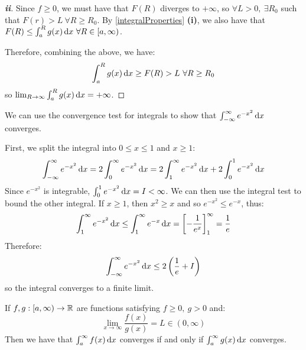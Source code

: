 \documentclass[../main.tex]{subfiles}
\begin{document}
\begin{proof}[\textbf{ii}]
  Since $f \geq 0$, we must have that $F(R)$ diverges to $+\infty$, so $\forall L > 0,\ \exists R_0$ such that $F(r) > L\ \forall R \geq R_0$.
  By \cref{integralProperties} \textbf{(i)}, we also have that $F(R) \leq \int_{a}^{R} g(x) \d{x}\ \forall R \in [a, \infty)$.

  Therefore, combining the above, we have:
  \[
    \int_{a}^{R} g(x) \d{x} \geq F(R) > L\ \forall R \geq R_0
  \]
  so $\lim_{R \to \infty} \int_{a}^{R} g(x) \d{x} = +\infty$.
\end{proof}
\begin{example}
  We can use the convergence test for integrals to show that $\int_{-\infty}^{\infty} e^{-x^2} \d{x}$ converges.

  First, we split the integral into $0 \leq x \leq 1$ and $x \geq 1$:
  \[
    \int_{-\infty}^{\infty} e^{-x^2} \d{x} = 2 \int_{0}^{\infty} e^{-x^2} \d{x} = 2 \int_{1}^{\infty} e^{-x^2} \d{x} + 2 \int_{0}^{1} e^{-x^2} \d{x}
  \]
  Since $e^{-x^2}$ is integrable, $\int_{0}^{1} e^{-x^2} \d{x} = I < \infty$.
  We can then use the integral test to bound the other integral.
  If $x \geq 1$, then $x^2 \geq x$ and so $e^{-x^2} \leq e^{-x}$, thus:
  \[
    \int_{1}^{\infty} e^{-x^2} \d{x} \leq \int_{1}^{\infty} e^{-x} \d{x} = \eval{-\frac{1}{e^{x}}}{1}{\infty} = \frac{1}{e}
  \]
  Therefore:
  \[
    \int_{-\infty}^{\infty} e^{-x^2} \d{x} \leq 2\left(\frac{1}{e} + I\right)
  \]
  so the integral converges to a finite limit.
\end{example}
\begin{proposition}
  If $f, g: [a, \infty) \to \mathbb{R}$ are functions satisfying $f \geq 0,\ g > 0$ and:
  \[
    \lim_{x \to \infty} \frac{f(x)}{g(x)} = L \in (0, \infty)
  \]
  Then we have that $\int_{a}^{\infty} f(x) \d{x}$ converges if and only if $\int_{a}^{\infty} g(x) \d{x}$ converges.
\end{proposition}
\end{document}
